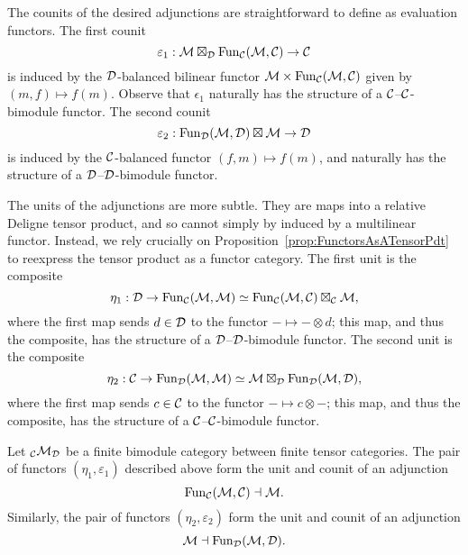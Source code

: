 \documentclass{amsart}
\begin{document}
The counits of the desired adjunctions are straightforward to define as evaluation functors.  The first counit
\[
\varepsilon_1 : \mathcal M \boxtimes_\mathcal D \operatorname{Fun}_\mathcal C(\mathcal M,\mathcal C) \rightarrow \mathcal C
\]
is induced by the $\mathcal D$-balanced bilinear functor $\mathcal M \times \operatorname{Fun}_\mathcal C(\mathcal M,\mathcal C)$ given by $(m,f) \mapsto f(m)$.  Observe that $\epsilon_1$ naturally has the structure of a $\mathcal C$--$\mathcal C$-bimodule functor.  The second counit
\[
\varepsilon_2 : \operatorname{Fun}_\mathcal D(\mathcal M,\mathcal D) \boxtimes \mathcal M \rightarrow \mathcal D
\]
is induced by the $\mathcal C$-balanced functor $(f,m) \mapsto f(m)$, and naturally has the structure of a $\mathcal D$--$\mathcal D$-bimodule functor.

The units of the adjunctions are more subtle.  They are maps into a relative Deligne tensor product, and so cannot simply by induced by a multilinear functor.  Instead, we rely crucially on Proposition~\ref{prop:FunctorsAsATensorPdt} to reexpress the tensor product as a functor category.  The first unit is the composite
\[
\eta_1 : \mathcal D \rightarrow \operatorname{Fun}_\mathcal C(\mathcal M,\mathcal M) \simeq \operatorname{Fun}_\mathcal C(\mathcal M,\mathcal C) \boxtimes_\mathcal C \mathcal M,
\]
where the first map sends $d \in \mathcal D$ to the functor $- \mapsto - \otimes d$; this map, and thus the composite, has the structure of a $\mathcal D$--$\mathcal D$-bimodule functor.  The second unit is the composite
\[
\eta_2 : \mathcal C \rightarrow \operatorname{Fun}_\mathcal D(\mathcal M,\mathcal M) \simeq \mathcal M \boxtimes_\mathcal D \operatorname{Fun}_\mathcal D(\mathcal M,\mathcal D),
\]
where the first map sends $c \in \mathcal C$ to the functor $- \mapsto c \otimes -$; this map, and thus the composite, has the structure of a $\mathcal C$--$\mathcal C$-bimodule functor.
\begin{proposition} \label{prop:evcoev}
Let ${}_\mathcal C \mathcal M_\mathcal D$ be a finite bimodule category between finite tensor categories.  The pair of functors $(\eta_1,\varepsilon_1)$ described above form the unit and counit of an adjunction
\[
\operatorname{Fun}_\mathcal C(\mathcal M,\mathcal C) \dashv \mathcal M.
\]
Similarly, the pair of functors $(\eta_2,\varepsilon_2)$ form the unit and counit of an adjunction
\[
\mathcal M \dashv \operatorname{Fun}_\mathcal D(\mathcal M,\mathcal D).
\]
\end{proposition}
\end{document}
